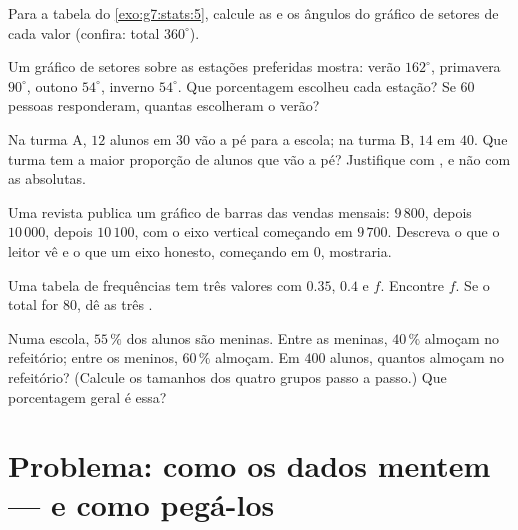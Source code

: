 \begin{exercise}[$\star$]\label{exo:g7:stats:6}
Para a tabela do \cref{exo:g7:stats:5}, calcule as  e os ângulos do gráfico de setores de cada valor (confira:
total $360^\circ$).
\end{exercise}

\begin{exercise}[$\star$]\label{exo:g7:stats:7}
Um gráfico de setores sobre as estações preferidas mostra: verão
$162^\circ$, primavera $90^\circ$, outono $54^\circ$, inverno
$54^\circ$. Que porcentagem escolheu cada estação? Se $60$ pessoas
responderam, quantas escolheram o verão?
\end{exercise}

\begin{exercise}[$\star\star$]\label{exo:g7:stats:8}
Na turma A, $12$ alunos em $30$ vão a pé para a escola; na turma B,
$14$ em $40$. Que turma tem a maior proporção de alunos que vão a pé?
Justifique com , e não com as absolutas.
\end{exercise}

\begin{exercise}[$\star\star$]\label{exo:g7:stats:9}
Uma revista publica um gráfico de barras das vendas mensais: $9\,800$,
depois $10\,000$, depois $10\,100$, com o eixo vertical começando em
$9\,700$. Descreva o que o leitor vê e o que um eixo honesto, começando
em $0$, mostraria.
\end{exercise}

\begin{exercise}[$\star\star$]\label{exo:g7:stats:10}
Uma tabela de frequências tem três valores com 
$0.35$, $0.4$ e $f$. Encontre $f$. Se o total for $80$, dê as três
.
\end{exercise}

\begin{exercise}[$\star\star\star$]\label{exo:g7:stats:11}
Numa escola, $55\,\%$ dos alunos são meninas. Entre as meninas,
$40\,\%$ almoçam no refeitório; entre os meninos, $60\,\%$ almoçam. Em
$400$ alunos, quantos almoçam no refeitório? (Calcule os tamanhos dos
quatro grupos passo a passo.) Que porcentagem geral é essa?
\end{exercise}

\section{Problema: como os dados mentem --- e como pegá-los}

